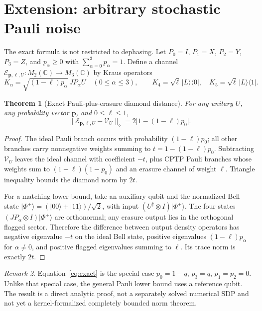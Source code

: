 \documentclass[11pt,a4paper]{article}
\newtheorem{theorem}{Theorem}[section]
\theoremstyle{remark}
\newtheorem{remark}[theorem]{Remark}
\newcommand{\Cd}{\mathbb{C}}
\begin{document}
\section{Extension: arbitrary stochastic Pauli noise}
The exact formula is not restricted to dephasing. Let $P_0=I$, $P_1=X$, $P_2=Y$, $P_3=Z$, and $p_\alpha\ge0$ with $\sum_{\alpha=0}^3p_\alpha=1$. Define a channel $\mathcal E_{\boldsymbol p,\ell,U}:M_2(\Cd)\to M_3(\Cd)$ by Kraus operators
\[
K_\alpha=\sqrt{(1-\ell)p_\alpha}\,JP_\alpha U\quad(0\le\alpha\le3),\qquad
K_4=\sqrt\ell\,|L\rangle\langle0|,\quad
K_5=\sqrt\ell\,|L\rangle\langle1|.
\]
\begin{theorem}[Exact Pauli-plus-erasure diamond distance]\label{thm:pauli}
For any unitary $U$, any probability vector $\boldsymbol p$, and $0\le\ell\le1$,
\begin{equation}\boxed{
\|\mathcal E_{\boldsymbol p,\ell,U}-\mathcal V_U\|_\diamond
=2\bigl[1-(1-\ell)p_0\bigr].}\label{eq:pauli}
\end{equation}
\end{theorem}
\begin{proof}
The ideal Pauli branch occurs with probability $(1-\ell)p_0$; all other branches carry nonnegative weights summing to $t=1-(1-\ell)p_0$. Subtracting $\mathcal V_U$ leaves the ideal channel with coefficient $-t$, plus CPTP Pauli branches whose weights sum to $(1-\ell)(1-p_0)$ and an erasure channel of weight $\ell$. Triangle inequality bounds the diamond norm by $2t$.

For a matching lower bound, take an auxiliary qubit and the normalized Bell state $|\Phi^+\rangle=(|00\rangle+|11\rangle)/\sqrt2$, with input $(U^\dagger\otimes I)|\Phi^+\rangle$. The four states $(JP_\alpha\otimes I)|\Phi^+\rangle$ are orthonormal; any erasure output lies in the orthogonal flagged sector. Therefore the difference between output density operators has negative eigenvalue $-t$ on the ideal Bell state, positive eigenvalues $(1-\ell)p_\alpha$ for $\alpha\ne0$, and positive flagged eigenvalues summing to $\ell$. Its trace norm is exactly $2t$.
\end{proof}
\begin{remark}
Equation~\eqref{eq:exact} is the special case $p_0=1-q$, $p_3=q$, $p_1=p_2=0$. Unlike that special case, the general Pauli lower bound uses a reference qubit. The result is a direct analytic proof, not a separately solved numerical SDP and not yet a kernel-formalized completely bounded norm theorem.
\end{remark}
\end{document}
